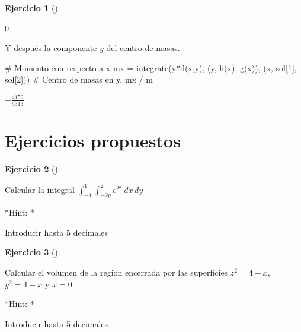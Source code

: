\documentclass[
  a4paper,
]{scrreport}
\newenvironment{Shaded}{\begin{snugshade}}{\end{snugshade}}
\newcommand{\CommentTok}[1]{\textcolor[rgb]{0.37,0.37,0.37}{#1}}
\newcommand{\FloatTok}[1]{\textcolor[rgb]{0.68,0.00,0.00}{#1}}
\newcommand{\FunctionTok}[1]{\textcolor[rgb]{0.28,0.35,0.67}{#1}}
\newcommand{\NormalTok}[1]{\textcolor[rgb]{0.00,0.23,0.31}{#1}}
\newcommand{\OperatorTok}[1]{\textcolor[rgb]{0.37,0.37,0.37}{#1}}
\theoremstyle{definition}
\newtheorem{exercise}{Ejercicio}[chapter]
\theoremstyle{remark}
\begin{document}
\begin{exercise}[]
\begin{enumerate}
\begin{tcolorbox}
  $0$

  Y después la componente \(y\) del centro de masas.

\begin{Shaded}
\begin{Highlighting}[]
\CommentTok{\# Momento con respecto a x}
\NormalTok{mx }\OperatorTok{=} \FunctionTok{integrate}\NormalTok{(}\FunctionTok{y*d}\NormalTok{(x,y), (y, }\FunctionTok{h}\NormalTok{(x), }\FunctionTok{g}\NormalTok{(x)), (x, sol[}\FloatTok{1}\NormalTok{], sol[}\FloatTok{2}\NormalTok{]))}
\CommentTok{\# Centro de masas en y.}
\NormalTok{mx }\OperatorTok{/}\NormalTok{ m}
\end{Highlighting}
\end{Shaded}

  $- \frac{4159}{5313}$

  \end{tcolorbox}
\end{enumerate}

\end{exercise}

\section{Ejercicios propuestos}\label{ejercicios-propuestos-8}

\begin{exercise}[]\protect\hypertarget{exr-integrales-funciones-varias-variables-propuesto-1}{}\label{exr-integrales-funciones-varias-variables-propuesto-1}

Calcular la integral \(\int_{-1}^1\int_{-2y}^{2} e^{x^2}\,dx\,dy\)

\vspace{18pt}*Hint: *

Introducir hasta 5 decimales

\end{exercise}

\begin{exercise}[]\protect\hypertarget{exr-integrales-funciones-varias-variables-propuesto-2}{}\label{exr-integrales-funciones-varias-variables-propuesto-2}

Calcular el volumen de la región encerrada por las superficies
\(z^2=4-x\), \(y^2=4-x\) y \(x=0\).

\vspace{18pt}*Hint: *

Introducir hasta 5 decimales

\end{exercise}
\end{document}
